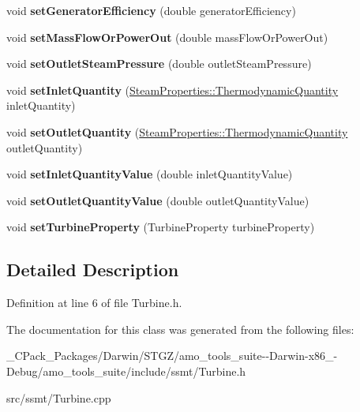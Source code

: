 \begin{DoxyCompactItemize}
\mbox{\label{class_turbine_a51e9c5050a5be51b86dc23e690bd3f40}} 
void {\bfseries set\+Generator\+Efficiency} (double generator\+Efficiency)
\item 
\mbox{\label{class_turbine_a73522631e2eeefa8ea14d5b537e3e760}} 
void {\bfseries set\+Mass\+Flow\+Or\+Power\+Out} (double mass\+Flow\+Or\+Power\+Out)
\item 
\mbox{\label{class_turbine_ab9612657de02e4523492b687917b4091}} 
void {\bfseries set\+Outlet\+Steam\+Pressure} (double outlet\+Steam\+Pressure)
\item 
\mbox{\label{class_turbine_aecc05c70870fb11bbc0bb4fe5d8438bd}} 
void {\bfseries set\+Inlet\+Quantity} (\hyperlink{class_steam_properties_ae0294bedf7d178c2d8fb6aed0f62fbff}{Steam\+Properties\+::\+Thermodynamic\+Quantity} inlet\+Quantity)
\item 
\mbox{\label{class_turbine_ad5ff4ba1657aac9519a6841336ec571c}} 
void {\bfseries set\+Outlet\+Quantity} (\hyperlink{class_steam_properties_ae0294bedf7d178c2d8fb6aed0f62fbff}{Steam\+Properties\+::\+Thermodynamic\+Quantity} outlet\+Quantity)
\item 
\mbox{\label{class_turbine_ac01a053462c83e21ecc2158e75477542}} 
void {\bfseries set\+Inlet\+Quantity\+Value} (double inlet\+Quantity\+Value)
\item 
\mbox{\label{class_turbine_ab37326068f633280de8f8144b9c8eb89}} 
void {\bfseries set\+Outlet\+Quantity\+Value} (double outlet\+Quantity\+Value)
\item 
\mbox{\label{class_turbine_abb3f16cefe52f4e9c7b32b2bb17a68ee}} 
void {\bfseries set\+Turbine\+Property} (Turbine\+Property turbine\+Property)
\end{DoxyCompactItemize}


\subsection{Detailed Description}


Definition at line 6 of file Turbine.\+h.



The documentation for this class was generated from the following files\+:\begin{DoxyCompactItemize}
\item 
\+\_\+\+C\+Pack\+\_\+\+Packages/\+Darwin/\+S\+T\+G\+Z/amo\+\_\+tools\+\_\+suite-\/-\/\+Darwin-\/x86\+\_-\/\+Debug/amo\+\_\+tools\+\_\+suite/include/ssmt/Turbine.\+h\item 
src/ssmt/Turbine.\+cpp\end{DoxyCompactItemize}
